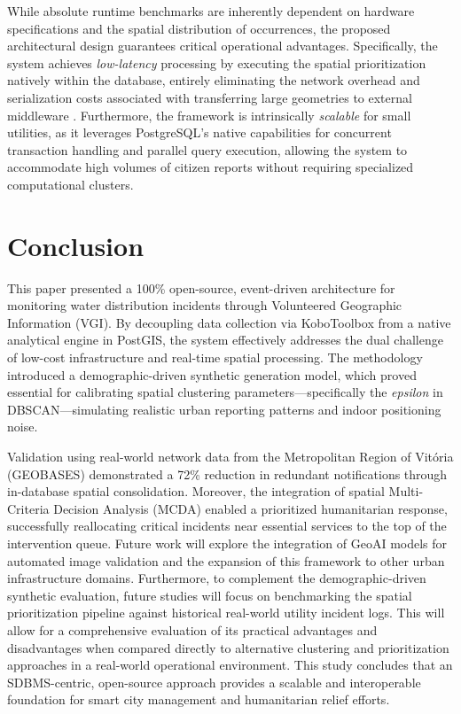 \documentclass[conference]{IEEEtran}
\renewcommand\hl[1]{#1}
\begin{document}
\hl{While absolute runtime benchmarks are inherently dependent on hardware specifications and the spatial distribution of occurrences, the proposed architectural design guarantees critical operational advantages. Specifically, the system achieves \textit{low-latency} processing by executing the spatial prioritization natively within the database, entirely eliminating the network overhead and serialization costs associated with transferring large geometries to external middleware \cite{obe2021}. Furthermore, the framework is intrinsically \textit{scalable} for small utilities, as it leverages PostgreSQL's native capabilities for concurrent transaction handling and parallel query execution, allowing the system to accommodate high volumes of citizen reports without requiring specialized computational clusters.}

\section{Conclusion}
\label{conclusion}

This paper presented a 100\% open-source, event-driven architecture for monitoring water distribution incidents through Volunteered Geographic Information (VGI). By decoupling data collection via KoboToolbox from a \hl{native} analytical engine in PostGIS, the system effectively addresses the dual challenge of low-cost infrastructure and real-time spatial processing. The methodology introduced a demographic-driven synthetic generation model, which proved essential for calibrating spatial clustering parameters—specifically the \textit{epsilon} in DBSCAN—simulating realistic urban reporting patterns and indoor positioning noise.

Validation using real-world network data from the Metropolitan Region of Vitória (GEOBASES) demonstrated a 72\% reduction in redundant notifications through in-database spatial consolidation. Moreover, the integration of spatial Multi-Criteria Decision Analysis (MCDA) enabled a prioritized humanitarian response, successfully reallocating critical incidents near essential services to the top of the intervention queue. Future work will explore the integration of GeoAI models for automated image validation and the expansion of this framework to other urban infrastructure domains. \hl{Furthermore, to complement the demographic-driven synthetic evaluation, future studies will focus on benchmarking the spatial prioritization pipeline against historical real-world utility incident logs. This will allow for a comprehensive evaluation of its practical advantages and disadvantages when compared directly to alternative clustering and prioritization approaches in a real-world operational environment.} This study concludes that an SDBMS-centric, open-source approach provides a scalable and interoperable foundation for smart city management and humanitarian relief efforts.
\end{document}
